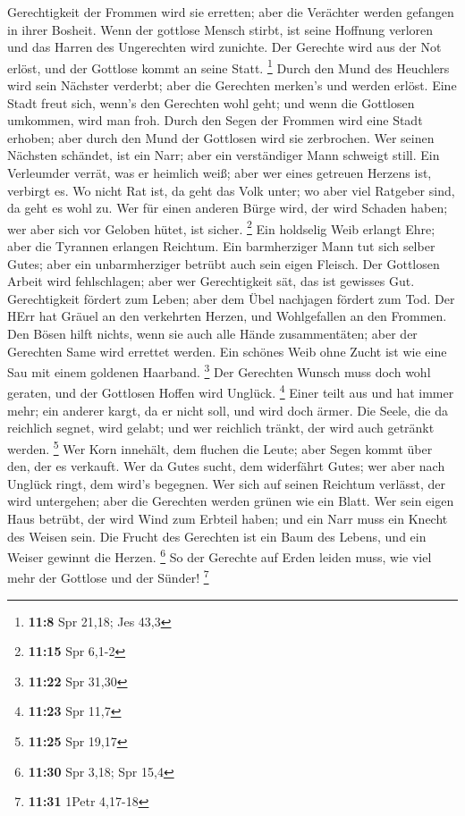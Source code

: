 Gerechtigkeit der Frommen wird sie erretten; aber die Verächter werden
gefangen in ihrer Bosheit.  Wenn der gottlose Mensch stirbt,
ist seine Hoffnung verloren und das Harren des Ungerechten wird
zunichte.  Der Gerechte wird aus der Not erlöst, und der
Gottlose kommt an seine Statt. \footnote{\textbf{11:8} Spr 21,18; Jes
  43,3}  Durch den Mund des Heuchlers wird sein Nächster
verderbt; aber die Gerechten merken's und werden erlöst. 
Eine Stadt freut sich, wenn's den Gerechten wohl geht; und wenn die
Gottlosen umkommen, wird man froh.  Durch den Segen der
Frommen wird eine Stadt erhoben; aber durch den Mund der Gottlosen wird
sie zerbrochen.  Wer seinen Nächsten schändet, ist ein
Narr; aber ein verständiger Mann schweigt still.  Ein
Verleumder verrät, was er heimlich weiß; aber wer eines getreuen Herzens
ist, verbirgt es.  Wo nicht Rat ist, da geht das Volk
unter; wo aber viel Ratgeber sind, da geht es wohl zu.  Wer
für einen anderen Bürge wird, der wird Schaden haben; wer aber sich vor
Geloben hütet, ist sicher. \footnote{\textbf{11:15} Spr 6,1-2}
 Ein holdselig Weib erlangt Ehre; aber die Tyrannen
erlangen Reichtum.  Ein barmherziger Mann tut sich selber
Gutes; aber ein unbarmherziger betrübt auch sein eigen Fleisch.
 Der Gottlosen Arbeit wird fehlschlagen; aber wer
Gerechtigkeit sät, das ist gewisses Gut.  Gerechtigkeit
fördert zum Leben; aber dem Übel nachjagen fördert zum Tod.
 Der HErr hat Gräuel an den verkehrten Herzen, und
Wohlgefallen an den Frommen.  Den Bösen hilft nichts, wenn
sie auch alle Hände zusammentäten; aber der Gerechten Same wird errettet
werden.  Ein schönes Weib ohne Zucht ist wie eine Sau mit
einem goldenen Haarband. \footnote{\textbf{11:22} Spr 31,30}
 Der Gerechten Wunsch muss doch wohl geraten, und der
Gottlosen Hoffen wird Unglück. \footnote{\textbf{11:23} Spr 11,7}
 Einer teilt aus und hat immer mehr; ein anderer kargt, da
er nicht soll, und wird doch ärmer.  Die Seele, die da
reichlich segnet, wird gelabt; und wer reichlich tränkt, der wird auch
getränkt werden. \footnote{\textbf{11:25} Spr 19,17}  Wer
Korn innehält, dem fluchen die Leute; aber Segen kommt über den, der es
verkauft.  Wer da Gutes sucht, dem widerfährt Gutes; wer
aber nach Unglück ringt, dem wird's begegnen.  Wer sich auf
seinen Reichtum verlässt, der wird untergehen; aber die Gerechten werden
grünen wie ein Blatt.  Wer sein eigen Haus betrübt, der
wird Wind zum Erbteil haben; und ein Narr muss ein Knecht des Weisen
sein.  Die Frucht des Gerechten ist ein Baum des Lebens,
und ein Weiser gewinnt die Herzen. \footnote{\textbf{11:30} Spr 3,18;
  Spr 15,4}  So der Gerechte auf Erden leiden muss, wie
viel mehr der Gottlose und der Sünder! \footnote{\textbf{11:31} 1Petr
  4,17-18}

